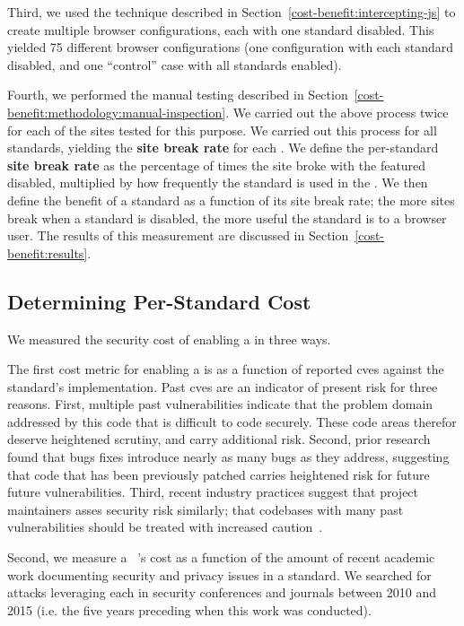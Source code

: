 Third, we used the technique described in
Section~\ref{cost-benefit:intercepting-js} to create multiple browser
configurations, each with one standard disabled.  This yielded 75 different
browser configurations (one configuration with each standard disabled, and one
``control'' case with all standards enabled).

Fourth, we performed the manual testing described in
Section~\ref{cost-benefit:methodology:manual-inspection}.  We carried out the
above process twice for each of the \NumSitesTestedInStandardTests sites tested
for this purpose.  We carried out this process for all \NumStandards standards,
yielding the \textbf{site break rate} for each \WAS.  We define the
per-standard \textbf{site break rate} as the percentage of times the site broke
with the featured disabled, multiplied by how frequently the standard is used
in the \ATK.  We then define the benefit of a standard as a function of its
site break rate; the more sites break when a standard is disabled, the more
useful the standard is to a browser user.  The results of this measurement are
discussed in Section~\ref{cost-benefit:results}.


\subsection{Determining Per-Standard Cost}
\label{cost-benefit:methodology:per-standard-cost}
We measured the security cost of enabling a \WAS in three ways.

The first cost metric for enabling a \WAS is as a function of reported
\gls{cve}s against the standard's implementation.  Past \gls{cve}s are an
indicator of present risk for three reasons.  First, multiple past
vulnerabilities indicate that the problem domain addressed by this code that is
difficult to code securely. These code areas therefor deserve heightened
scrutiny, and carry additional risk.  Second, prior
research~\cite{ozment2006milk,zimmermann2008predicting} found that bugs fixes
introduce nearly as many bugs as they address, suggesting that code that has
been previously patched carries heightened risk for future future
vulnerabilities.  Third, recent industry practices suggest that project
maintainers asses security risk similarly; that codebases with many past
vulnerabilities should be treated with increased caution~\cite{boringssl}.

Second, we measure a \WAS~'s cost as a function of the amount of recent academic
work documenting security and privacy issues in a standard.  We searched
for attacks leveraging each \WAS in security conferences and journals between
2010 and 2015 (i.e. the five years preceding when this work was conducted).

